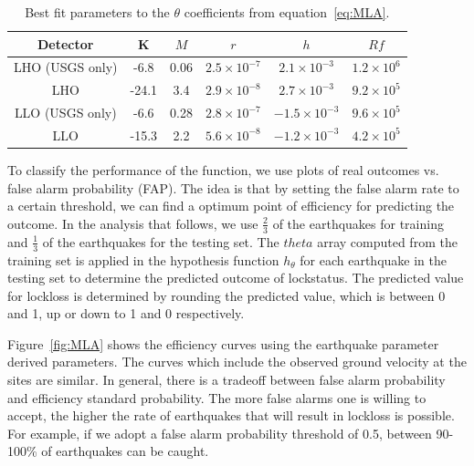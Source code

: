 \documentclass[reprint, prl, aps, showpacs]{revtex4-1}
\begin{document}
\begin{table}[]
\centering
\label{table:MLAfit}
\begin{tabular}{|c|c|c|c|c|c|}
\hline
Detector & K & $M$ & $r$ & $h$ & $Rf$  \\ \hline
LHO (USGS only) & -6.8 & 0.06 & $2.5 \times 10^{-7}$ & $2.1 \times 10^{-3}$ & $1.2 \times 10^{6}$ \\ \hline
LHO & -24.1 & 3.4 & $2.9 \times 10^{-8}$ & $2.7 \times 10^{-3}$ & $9.2 \times 10^{5}$ \\ \hline
LLO (USGS only) & -6.6 & 0.28 & $2.8 \times 10^{-7}$ & $-1.5 \times 10^{-3}$ & $9.6 \times 10^{5}$ \\ \hline
LLO & -15.3 & 2.2 & $5.6 \times 10^{-8}$ & $-1.2 \times 10^{-3}$ & $4.2 \times 10^{5}$\\ \hline
\end{tabular}
\caption{Best fit parameters to the $\theta$ coefficients from equation~\ref{eq:MLA}.}
\end{table}
	
To classify the performance of the function, we use plots of real outcomes vs. false alarm probability (FAP). The idea is that by setting the false alarm rate to a certain threshold, we can find a optimum point of efficiency for predicting the outcome.
In the analysis that follows, we use $\frac{2}{3}$ of the earthquakes for training and  $\frac{1}{3}$ of the earthquakes for the testing set. The $theta$ array computed from the training set is applied in the hypothesis function $h_{\theta}$ for each earthquake in the testing set to determine the predicted outcome of lockstatus. The predicted value for lockloss is determined by rounding the predicted value, which is between 0 and 1, up or down to 1 and 0 respectively.

Figure~\ref{fig:MLA} shows the efficiency curves using the earthquake parameter derived parameters. 
The curves which include the observed ground velocity at the sites are similar. 
In general, there is a tradeoff between false alarm probability and efficiency standard probability.
The more false alarms one is willing to accept, the higher the rate of earthquakes that will result in lockloss is possible.
For example, if we adopt a false alarm probability threshold of 0.5, between 90-100\% of earthquakes can be caught.
	
\end{document}
